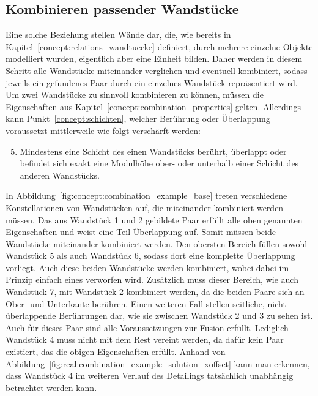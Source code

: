 \subsection{Kombinieren passender Wandstücke}\label{real:combination}
Eine solche Beziehung stellen Wände dar, die, wie bereits in Kapitel~\ref{concept:relations_wandtuecke} definiert, durch mehrere einzelne Objekte modelliert wurden, eigentlich aber eine Einheit bilden.
Daher werden in diesem Schritt alle Wandstücke miteinander verglichen und eventuell kombiniert, sodass jeweils ein gefundenes Paar durch ein einzelnes Wandstück repräsentiert wird.
Um zwei Wandstücke zu sinnvoll kombinieren zu können, müssen die Eigenschaften aus Kapitel~\ref{concept:combination_properties} gelten.
Allerdings kann Punkt~\ref{concept:schichten}, welcher Berührung oder Überlappung voraussetzt mittlerweile wie folgt verschärft werden:

\begin{enumerate}
\setcounter{enumi}{4}
\item\label{real:schichten} Mindestens eine Schicht des einen Wandstücks berührt, überlappt oder befindet sich exakt eine Modulhöhe ober- oder unterhalb einer Schicht des anderen Wandstücks.
\end{enumerate}

In Abbildung~\ref{fig:concept:combination_example_base} treten verschiedene Konstellationen von Wandstücken auf, die miteinander kombiniert werden müssen.
Das aus Wandstück 1 und 2 gebildete Paar erfüllt alle oben genannten Eigenschaften und weist eine Teil-Überlappung auf.
Somit müssen beide Wandstücke miteinander kombiniert werden.
Den obersten Bereich füllen sowohl Wandstück 5 als auch Wandstück 6, sodass dort eine komplette Überlappung vorliegt.
Auch diese beiden Wandstücke werden kombiniert, wobei dabei im Prinzip einfach eines verworfen wird.
Zusätzlich muss dieser Bereich, wie auch Wandstück 7, mit Wandstück 2 kombiniert werden, da die beiden Paare sich an Ober- und Unterkante berühren.
Einen weiteren Fall stellen seitliche, nicht überlappende Berührungen dar, wie sie zwischen Wandstück 2 und 3 zu sehen ist.
Auch für dieses Paar sind alle Voraussetzungen zur Fusion erfüllt.
Lediglich Wandstück 4 muss nicht mit dem Rest vereint werden, da dafür kein Paar existiert, das die obigen Eigenschaften erfüllt.
Anhand von Abbildung~\ref{fig:real:combination_example_solution_xoffset} kann man erkennen, dass Wandstück 4 im weiteren Verlauf des Detailings tatsächlich unabhängig betrachtet werden kann. 

